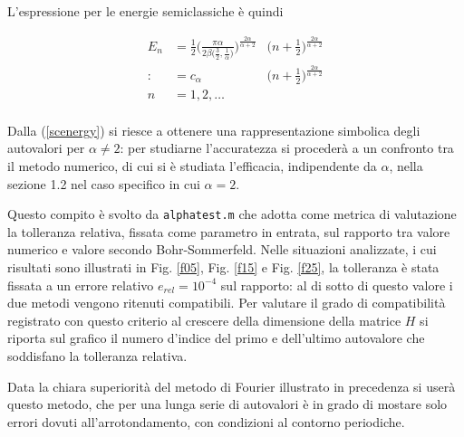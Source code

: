 \documentclass[a4paper,11pt,twoside,twocolumn]{article}
\begin{document}
L'espressione per le energie semiclassiche è quindi

\begin{equation}
    \begin{aligned}
    E_n & =
    \frac{1}{2}\Bigg(\frac{\pi\alpha}{2\beta\big(\frac{3}{2},\frac{1}{\alpha}\big)}\Bigg)^\frac{2\alpha}{\alpha+2} &\Bigg(n+\frac{1}{2}\Bigg)^\frac{2\alpha}{\alpha+2} \\
    :&= c_{\alpha} &\Bigg(n+\frac{1}{2}\Bigg)^\frac{2\alpha}{\alpha+2} \\
    n&=1,2,\dots\\
    \end{aligned}
    \label{scenergy}
\end{equation}

Dalla (\ref{scenergy}) si riesce a ottenere una rappresentazione simbolica degli autovalori per \( \alpha \neq 2 \): per studiarne l'accuratezza si procederà a un confronto tra il metodo numerico, di cui si è studiata l'efficacia, indipendente da \(\alpha\), nella sezione 1.2 nel caso specifico in cui \(\alpha = 2 \).

Questo compito è svolto da \verb|alphatest.m| che adotta come metrica di valutazione la tolleranza relativa, fissata come parametro in entrata, sul rapporto tra valore numerico e valore secondo Bohr-Sommerfeld. Nelle situazioni analizzate, i cui risultati sono illustrati in Fig. \ref{f05}, Fig. \ref{f15} e Fig. \ref{f25}, la tolleranza è stata fissata a un errore relativo \(e_{rel}=10^{-4}\) sul rapporto: al di sotto di questo valore i due metodi vengono ritenuti compatibili. Per valutare il grado di compatibilità registrato con questo criterio al crescere della dimensione della matrice \(H\) si riporta sul grafico il numero d'indice del primo e dell'ultimo autovalore che soddisfano la tolleranza relativa.

Data la chiara superiorità del metodo di Fourier illustrato in precedenza si userà questo metodo, che per una lunga serie di autovalori è in grado di mostare solo errori dovuti all'arrotondamento, con condizioni al contorno periodiche. 
\end{document}
